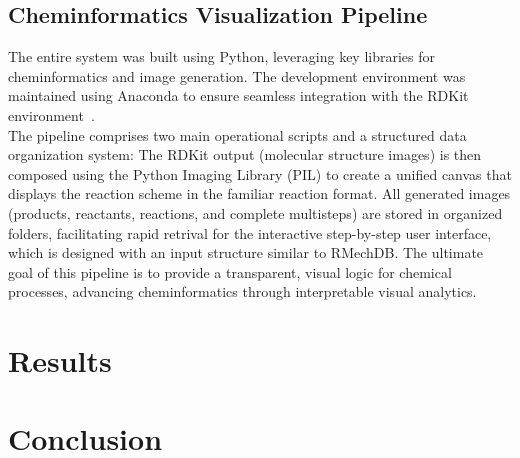 \documentclass[12pt]{article}
\begin{document}
\subsection{Cheminformatics Visualization Pipeline}
The entire system was built using Python, leveraging key libraries for cheminformatics and image generation.
The development environment was maintained using Anaconda to ensure seamless integration with the RDKit environment~\cite{rdkit2025overview}.
\\
The pipeline comprises two main operational scripts and a structured data organization system:
{
}
The RDKit output (molecular structure images) is then composed using the Python Imaging Library (PIL) to create a unified canvas that displays the reaction scheme in the familiar reaction format.
All generated images (products, reactants, reactions, and complete multisteps) are stored in organized folders, facilitating rapid retrival for the interactive step-by-step user interface, which is designed with an input structure similar to RMechDB.
The ultimate goal of this pipeline is to provide a transparent, visual logic for chemical processes, advancing cheminformatics through interpretable visual analytics.



\section{Results}

\section{Conclusion}



\end{document}
